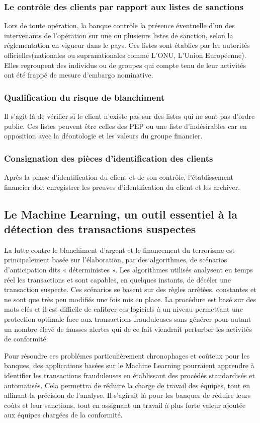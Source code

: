   \subsubsection{Le contrôle des clients par rapport aux listes de sanctions}
    Lors de toute opération, la banque contrôle la présence éventuelle d'un
     des intervenants de l'opération sur une ou plusieurs listes de 
    sanction, selon la réglementation en vigueur dans le pays. Ces listes sont
    établies par les autorités officielles(nationales ou supranationales comme
    L'ONU, L'Union Européenne). Elles regroupent des individus ou de groupes qui
    compte tenu de leur activités ont été frappé de mesure d'embargo nominative.

  \subsubsection{Qualification du risque de blanchiment}
    Il s'agit là de vérifier si le client n'existe pas sur des listes qui ne 
    sont pas d'ordre public. Ces listes peuvent être celles des PEP
     ou une liste d'indésirables car en opposition 
    avec la déontologie et les valeurs du groupe financier.

  \subsubsection{Consignation des pièces d'identification des clients}
    Après la phase d'identification du client et de son contrôle, 
    l'établissement financier doit enregistrer les preuves d'identification du
    client et les archiver.

    
\subsection{Le Machine Learning, un outil essentiel à la détection des 
 transactions suspectes}
 
 La lutte contre le blanchiment d'argent et le financement du terrorisme est
 principalement basée sur l'élaboration, par des algorithmes, de scénarios
 d'anticipation dits « déterministes ». Les algorithmes utilisés analysent
 en temps réel les transactions et sont capables, en quelques instants, de
 décéler une transaction suspecte. Ces scénarios se basent sur des règles
 arrêtées, constantes et ne sont que très peu modifiés une fois mis en 
 place. La procédure est basé sur des mots clés et il est difficile de calibrer
 ces logiciels à un niveau permettant une protection optimale face aux 
 transactions frauduleuses sans générer pour autant un nombre élevé de fausses
 alertes qui de ce fait viendrait perturber les activités de conformité.

 Pour résoudre ces problémes particulièrement chronophages et coûteux pour les
 banques, des applications basées sur le Machine Learning pourraient apprendre
 à identifier les transactions frauduleuses en établissant des procédés 
 standardisés et automatisés. Cela permettra de réduire la charge de travail des
 équipes, tout en affinant la précision de l'analyse. Il s'agirait là pour les
 banques de réduire leurs coùts et leur sanctions, tout en assignant un travail
 à plus forte valeur ajoutée aux équipes chargées de la conformité.
